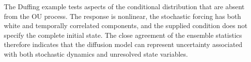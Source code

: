 The Duffing example tests aspects of the conditional distribution that are absent from the OU process. The response is nonlinear, the stochastic forcing has both white and temporally correlated components, and the supplied condition does not specify the complete initial state. The close agreement of the ensemble statistics therefore indicates that the diffusion model can represent uncertainty associated with both stochastic dynamics and unresolved state variables.

